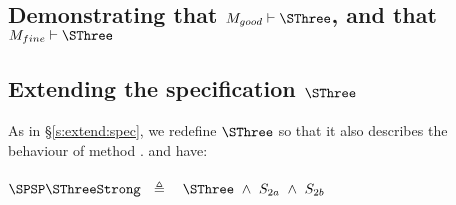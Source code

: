 

\subsection{Demonstrating that $M_{good} \vdash \SThree$, and that $M_{fine} \vdash \SThree$}
 \label{s:app:example:proofs:S3}


 \subsection{Extending the specification $\SThree$}
\label{s:extend:spec:three}

As in \S \ref{s:extend:spec}, we redefine $\SThree$ so that it also describes the behaviour of method . and have:
\\
\\
$\strut  \SPSP  \SThreeStrong \ \  \triangleq \ \ \ \SThree \ \wedge \ S_{2a} \ \wedge \ S_{2b} $



  

